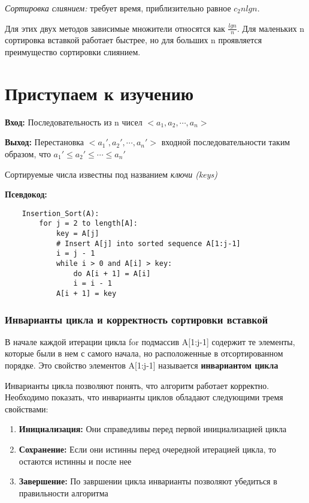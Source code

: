 \documentclass[a4paper, 12pt]{article}
\begin{document}
\textit{Сортировка слиянием:} требует время, приблизительно равное $c_2nlgn$.

Для этих двух методов зависимые множители относятся как $\frac{lgn}{n}$. 
Для маленьких n сортировка вставкой работает быстрее, но для больших n проявляется преимущество сортировки слиянием.

\part{Приступаем к изучению}


\textbf{Вход:} Последовательность из n чисел $<a_1, a_2, \cdots, a_n>$

\textbf{Выход:} Перестановка $<a_1', a_2', \cdots, a_n'>$ входной последовательности таким образом, что $a_1' \leq a_2' \leq \cdots \leq a_n'$

Сортируемые числа известны под названием \textit{ключи (keys)}

\textbf{Псевдокод:}

\begin{lstlisting}
    Insertion_Sort(A):
        for j = 2 to length[A]:
            key = A[j]
            # Insert A[j] into sorted sequence A[1:j-1]
            i = j - 1
            while i > 0 and A[i] > key:
                do A[i + 1] = A[i]
                i = i - 1
            A[i + 1] = key
\end{lstlisting}

\section{Инварианты цикла и корректность сортировки вставкой}

В начале каждой итерации цикла for подмассив A[1:j-1] содержит те элементы, которые были в нем с самого начала, 
но расположенные в отсортированном порядке. Это свойство элементов A[1:j-1] называется \textbf{инвариантом цикла}

Инварианты цикла позволяют понять, что алгоритм работает корректно. Необходимо показать, 
что инварианты циклов обладают следующими тремя свойствами:

\begin{enumerate}
    \item \textbf{Инициализация:} Они справедливы перед первой инициализацией цикла
    \item \textbf{Сохранение:} Если они истинны перед очередной итерацией цикла, то остаются истинны и после нее
    \item \textbf{Завершение:} По завршении цикла инварианты позволяют убедиться в правильности алгоритма
\end{enumerate}
\end{document}
